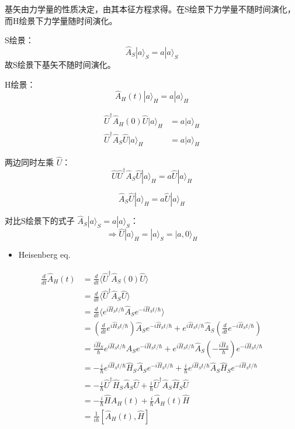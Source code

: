 \documentclass[lang=cn,15pt]{elegantbook}
\begin{document}
基矢由力学量的性质决定，由其本征方程求得。在S绘景下力学量不随时间演化，而H绘景下力学量随时间演化。

S绘景：
\[ \hat{A}_S |a\rangle_S = a |a\rangle_S \]
故S绘景下基矢不随时间演化。

H绘景：
\[ \hat{A}_H(t) |a\rangle_H = a |a\rangle_H \]

\begin{align*}
	\hat{U}^\dagger \hat{A}_H(0) \hat{U} |a\rangle_H &= a |a\rangle_H \\
	\hat{U}^\dagger \hat{A}_S \hat{U} |a\rangle_H &= a |a\rangle_H
\end{align*}

两边同时左乘 \(\hat{U}\)：
\[ \hat{U} \hat{U}^\dagger \hat{A}_S \hat{U} |a\rangle_H = a \hat{U} |a\rangle_H \]

\[ \hat{A}_S \hat{U} |a\rangle_H = a \hat{U} |a\rangle_H \]

对比S绘景下的式子 \(\hat{A}_S |a\rangle_S = a |a\rangle_S\)：
\[ \Rightarrow \hat{U} |a\rangle_H = |a\rangle_S = |a, 0\rangle_H \]

\begin{itemize}
	\item Heisenberg eq.
\end{itemize}

\begin{align*}
	\frac{d}{dt} \hat{A}_H(t) &= \frac{d}{dt} \langle \hat{U}^\dagger \hat{A}_S(0) \hat{U} \rangle \\
	&= \frac{d}{dt} \langle \hat{U}^\dagger \hat{A}_S \hat{U} \rangle \\
	&= \frac{d}{dt} \langle e^{i \hat{H}_S t / \hbar} \hat{A}_S e^{-i \hat{H}_S t / \hbar} \rangle \\
	&= \left( \frac{d}{dt} e^{i \hat{H}_S t / \hbar} \right) \hat{A}_S e^{-i \hat{H}_S t / \hbar} + e^{i \hat{H}_S t / \hbar} \hat{A}_S \left( \frac{d}{dt} e^{-i \hat{H}_S t / \hbar} \right) \\
	&= \frac{i \hat{H}_S}{\hbar} e^{i \hat{H}_S t / \hbar} \hat{A}_S e^{-i \hat{H}_S t / \hbar} + e^{i \hat{H}_S t / \hbar} \hat{A}_S \left( -\frac{i \hat{H}_S}{\hbar} \right) e^{-i \hat{H}_S t / \hbar} \\
	&= -\frac{i}{\hbar} e^{i \hat{H}_S t / \hbar} \hat{H}_S \hat{A}_S e^{-i \hat{H}_S t / \hbar} + \frac{i}{\hbar} e^{i \hat{H}_S t / \hbar} \hat{A}_S \hat{H}_S e^{-i \hat{H}_S t / \hbar} \\
	&= -\frac{i}{\hbar} \hat{U}^\dagger \hat{H}_S \hat{A}_S \hat{U} + \frac{i}{\hbar} \hat{U}^\dagger \hat{A}_S \hat{H}_S \hat{U} \\
	&= -\frac{i}{\hbar} \hat{H} \hat{A}_H(t) + \frac{i}{\hbar} \hat{A}_H(t) \hat{H} \\
	&= \frac{1}{i \hbar} [\hat{A}_H(t), \hat{H}]
\end{align*}
\end{document}
